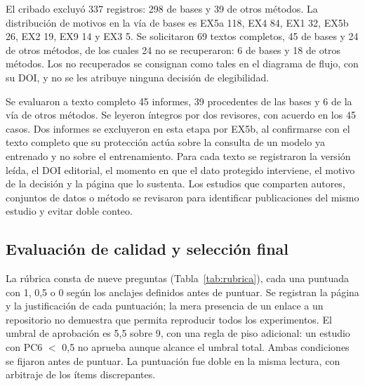 \documentclass[pdflatex,sn-mathphys-num]{sn-jnl}
\theoremstyle{thmstyleone}
\theoremstyle{thmstyletwo}
\theoremstyle{thmstylethree}
\begin{document}
El cribado excluyó 337 registros: 298 de bases y 39 de otros métodos. La distribución de motivos en la vía de bases es EX5a 118, EX4 84, EX1 32, EX5b 26, EX2 19, EX9 14 y EX3 5. Se solicitaron 69 textos completos, 45 de bases y 24 de otros métodos, de los cuales 24 no se recuperaron: 6 de bases y 18 de otros métodos. Los no recuperados se consignan como tales en el diagrama de flujo, con su DOI, y no se les atribuye ninguna decisión de elegibilidad.

Se evaluaron a texto completo 45 informes, 39 procedentes de las bases y 6 de la vía de otros métodos. Se leyeron íntegros por dos revisores, con acuerdo en los 45 casos. Dos informes se excluyeron en esta etapa por EX5b, al confirmarse con el texto completo que su protección actúa sobre la consulta de un modelo ya entrenado y no sobre el entrenamiento. Para cada texto se registraron la versión leída, el DOI editorial, el momento en que el dato protegido interviene, el motivo de la decisión y la página que lo sustenta. Los estudios que comparten autores, conjuntos de datos o método se revisaron para identificar publicaciones del mismo estudio y evitar doble conteo.

\subsection{Evaluación de calidad y selección final}\label{sec:calidad}

La rúbrica consta de nueve preguntas (Tabla~\ref{tab:rubrica}), cada una puntuada con 1, 0,5 o 0 según los anclajes definidos antes de puntuar. Se registran la página y la justificación de cada puntuación; la mera presencia de un enlace a un repositorio no demuestra que permita reproducir todos los experimentos. El umbral de aprobación es 5,5 sobre 9, con una regla de piso adicional: un estudio con PC6 $<$ 0,5 no aprueba aunque alcance el umbral total. Ambas condiciones se fijaron antes de puntuar. La puntuación fue doble en la misma lectura, con arbitraje de los ítems discrepantes.
\end{document}
